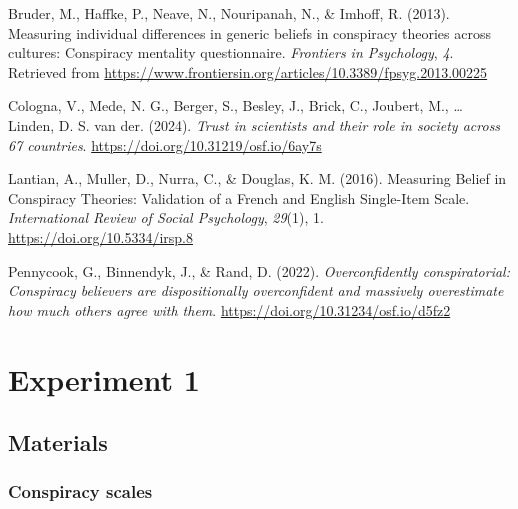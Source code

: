 \documentclass[
  doc,floatsintext]{apa6}
\newlength{\cslhangindent}
\newenvironment{CSLReferences}[2] %
 {\begin{list}{}{%
  \setlength{\itemindent}{0pt}
  \setlength{\leftmargin}{0pt}
  \setlength{\parsep}{0pt}
  \ifodd #1
   \setlength{\leftmargin}{\cslhangindent}
   \setlength{\itemindent}{-1\cslhangindent}
  \fi
  \setlength{\itemsep}{#2\baselineskip}}}
 {\end{list}}
\begin{document}
\label{refs}
\begin{CSLReferences}{1}{0}
Bruder, M., Haffke, P., Neave, N., Nouripanah, N., \& Imhoff, R. (2013). Measuring individual differences in generic beliefs in conspiracy theories across cultures: Conspiracy mentality questionnaire. \emph{Frontiers in Psychology}, \emph{4}. Retrieved from \url{https://www.frontiersin.org/articles/10.3389/fpsyg.2013.00225}

Cologna, V., Mede, N. G., Berger, S., Besley, J., Brick, C., Joubert, M., \ldots{} Linden, D. S. van der. (2024). \emph{Trust in scientists and their role in society across 67 countries}. \url{https://doi.org/10.31219/osf.io/6ay7s}

Lantian, A., Muller, D., Nurra, C., \& Douglas, K. M. (2016). Measuring Belief in Conspiracy Theories: Validation of a French and English Single-Item Scale. \emph{International Review of Social Psychology}, \emph{29}(1), 1. \url{https://doi.org/10.5334/irsp.8}

Pennycook, G., Binnendyk, J., \& Rand, D. (2022). \emph{Overconfidently conspiratorial: Conspiracy believers are dispositionally overconfident and massively overestimate how much others agree with them}. \url{https://doi.org/10.31234/osf.io/d5fz2}

\end{CSLReferences}

\newpage

\appendix


\section{Experiment 1}\label{exp1}

\subsection{Materials}\label{materials-3}

\FloatBarrier

\subsubsection{Conspiracy scales}\label{conspiracy-scales-1}
\end{document}
